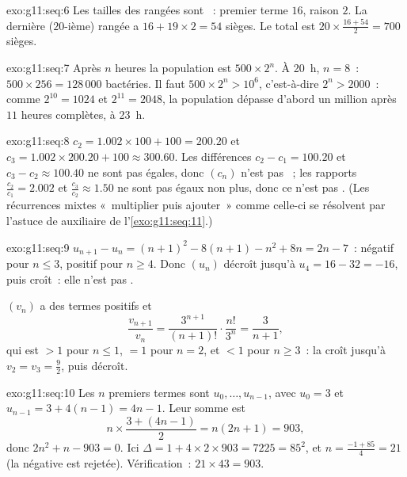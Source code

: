 \begin{solution}{exo:g11:seq:6}
Les tailles des rangées sont ~: premier terme $16$, raison
$2$. La dernière ($20$-ième) rangée a $16 + 19 \times 2 = 54$ sièges. Le
total est $20 \times \frac{16 + 54}{2} = 700$ sièges.
\end{solution}

\begin{solution}{exo:g11:seq:7}
Après $n$ heures la population est $500 \times 2^n$. À 20~h, $n = 8$~:
$500 \times 256 = 128\,000$ bactéries. Il faut $500 \times 2^n >
10^6$, c'est-à-dire $2^n > 2000$~: comme $2^{10} = 1024$ et
$2^{11} = 2048$, la population dépasse d'abord un million après $11$
heures complètes, à 23~h.
\end{solution}

\begin{solution}{exo:g11:seq:8}
$c_2 = 1.002 \times 100 + 100 = 200.20$ et
$c_3 = 1.002 \times 200.20 + 100 \approx 300.60$. Les différences
$c_2 - c_1 = 100.20$ et $c_3 - c_2 \approx 100.40$ ne sont pas égales,
donc $(c_n)$ n'est pas ~; les rapports
$\frac{c_2}{c_1} = 2.002$ et $\frac{c_3}{c_2} \approx 1.50$ ne sont pas
égaux non plus, donc ce n'est pas . (Les récurrences mixtes
«~multiplier puis ajouter~» comme celle-ci se résolvent par l'astuce de
 auxiliaire de l'\cref{exo:g11:seq:11}.)
\end{solution}

\begin{solution}{exo:g11:seq:9}
$u_{n+1} - u_n = (n+1)^2 - 8(n+1) - n^2 + 8n = 2n - 7$~: négatif pour
$n \leq 3$, positif pour $n \geq 4$. Donc $(u_n)$ décroît jusqu'à
$u_4 = 16 - 32 = -16$, puis croît~: elle n'est pas .

$(v_n)$ a des termes positifs et
\[
\frac{v_{n+1}}{v_n} = \frac{3^{n+1}}{(n+1)!} \cdot \frac{n!}{3^n}
= \frac{3}{n+1},
\]
qui est $> 1$ pour $n \leq 1$, $= 1$ pour $n = 2$, et $< 1$ pour
$n \geq 3$~: la  croît jusqu'à $v_2 = v_3 = \frac92$, puis
décroît.
\end{solution}

\begin{solution}{exo:g11:seq:10}
Les $n$ premiers termes sont $u_0, \dots, u_{n-1}$, avec $u_0 = 3$ et
$u_{n-1} = 3 + 4(n-1) = 4n - 1$. Leur somme est
\[
n \times \frac{3 + (4n-1)}{2} = n(2n + 1) = 903,
\]
donc $2n^2 + n - 903 = 0$. Ici $\Delta = 1 + 4 \times 2 \times 903 =
7225 = 85^2$, et $n = \frac{-1 + 85}{4} = 21$ (la  négative est
rejetée). Vérification~: $21 \times 43 = 903$.
\end{solution}


